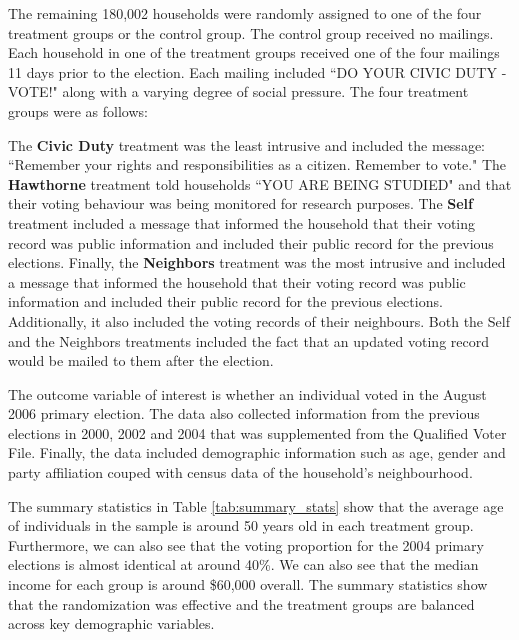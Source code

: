 \documentclass[11pt]{article}
\begin{document}
The remaining 180,002 households were randomly assigned to one of the four treatment groups or the control group. The control group received no mailings. Each household in one of the treatment groups received one of the four mailings 11 days prior to the election. Each mailing included ``DO YOUR CIVIC DUTY - VOTE!" along with a varying degree of social pressure. The four treatment groups were as follows:

The \textbf{Civic Duty} treatment was the least intrusive and included the message: ``Remember your rights and responsibilities as a citizen. Remember to vote." The \textbf{Hawthorne} treatment told households ``YOU ARE BEING STUDIED" and that their voting behaviour was being monitored for research purposes. The \textbf{Self} treatment included a message that informed the household that their voting record was public information and included their public record for the previous elections. Finally, the \textbf{Neighbors} treatment was the most intrusive and included a message that informed the household that their voting record was public information and included their public record for the previous elections. Additionally, it also included the voting records of their neighbours.
Both the Self and the Neighbors treatments included the fact that an updated voting record would be mailed to them after the election.

The outcome variable of interest is whether an individual voted in the August 2006 primary election. The data also collected information from the previous elections in 2000, 2002 and 2004 that was supplemented from the Qualified Voter File. Finally, the data included demographic information such as age, gender and party affiliation couped with census data of the household's neighbourhood.

\begin{table}[H]
    \centering
    \caption{Summary Statistics}
    \label{tab:summary_stats}
    
\end{table}

The summary statistics in Table \ref{tab:summary_stats} show that the average age of individuals in the sample is around 50 years old in each treatment group. Furthermore, we can also see that the voting proportion for the 2004 primary elections is almost identical at around 40\%. We can also see that the median income for each group is around \$60,000 overall. The summary statistics show that the randomization was effective and the treatment groups are balanced across key demographic variables.
\end{document}
